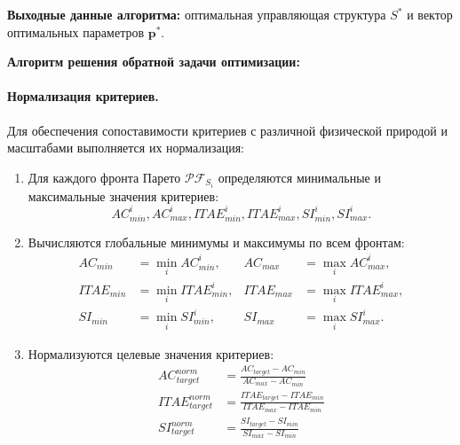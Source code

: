 \textbf{Выходные данные алгоритма:} оптимальная управляющая структура $S^*$ и вектор оптимальных параметров $\mathbf{p}^*$.

\textbf{Алгоритм решения обратной задачи оптимизации:}

\paragraph*{Нормализация критериев.}

Для обеспечения сопоставимости критериев с различной
физической природой и масштабами выполняется их нормализация:

\begin{enumerate}
    \item Для каждого фронта Парето $\mathcal{PF}_{S_i}$ определяются минимальные и максимальные значения критериев:
          \begin{equation*}
              AC_{min}^i, AC_{max}^i, ITAE_{min}^i, ITAE_{max}^i, SI_{min}^i, SI_{max}^i.
          \end{equation*}

    \item Вычисляются глобальные минимумы и максимумы по всем фронтам:
          \begin{equation*}
              \begin{aligned}
                  AC_{min}   & = \min_i AC_{min}^i,   & AC_{max}   & = \max_i AC_{max}^i ,  \\
                  ITAE_{min} & = \min_i ITAE_{min}^i, & ITAE_{max} & = \max_i ITAE_{max}^i ,\\
                  SI_{min}   & = \min_i SI_{min}^i,   & SI_{max}   & = \max_i SI_{max}^i.
              \end{aligned}
          \end{equation*}

    \item Нормализуются целевые значения критериев:
          \begin{equation*}
              \begin{aligned}
                  AC_{target}^{norm}   & = \frac{AC_{target} - AC_{min}}{AC_{max} - AC_{min}}         \\
                  ITAE_{target}^{norm} & = \frac{ITAE_{target} - ITAE_{min}}{ITAE_{max} - ITAE_{min}} \\
                  SI_{target}^{norm}   & = \frac{SI_{target} - SI_{min}}{SI_{max} - SI_{min}}
              \end{aligned}
          \end{equation*}
\end{enumerate}

